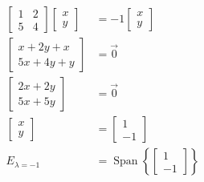 \documentclass{book}
\DeclareMathOperator{\SPAN}{Span}
\begin{document}
\begin{align*}
        \begin{bmatrix}
        1 & 2 \\
        5 & 4  
        \end{bmatrix} 
        \left[ \begin{array}{c} 
        x \\
        y 
        \end{array} 
        \right]  &= 
        -1\left[ \begin{array}{c} 
        x \\
        y 
        \end{array} \right] \\
        \left[ \begin{array}{c} 
        x + 2y + x\\
        5x + 4y + y 
        \end{array} 
        \right] &= \vec{0} \\
        \left[ \begin{array}{c} 
        2x + 2y \\
        5x + 5y 
        \end{array} 
        \right] &= \vec{0} \\
        \left[ \begin{array}{c} 
        x \\
        y 
        \end{array} 
        \right] &= 
        \left[\begin{array}{c} 
        1 \\
        -1 
        \end{array} 
        \right] \\ 
        \mathit{E}_{\lambda=-1} &= \SPAN \left\{
            \left[ \begin{array}{c}   
            1 \\
            -1 
            \end{array} \right]
        \right\}
\end{align*}
\end{document}
